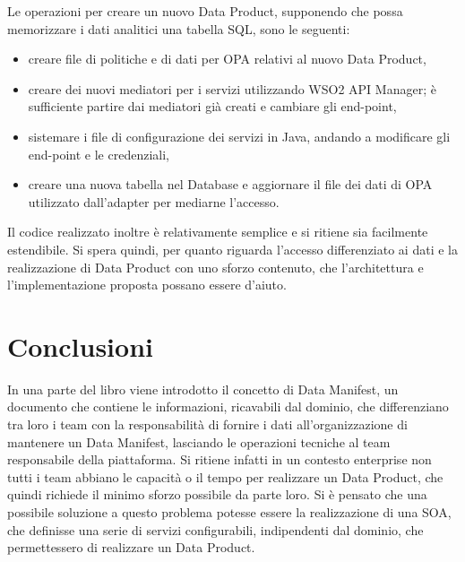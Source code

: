 \documentclass[12pt]{report}
\begin{document}
Le operazioni per creare un nuovo Data Product, supponendo che possa memorizzare i dati analitici una tabella SQL, sono le seguenti: 
\begin{itemize}
    \item creare file di politiche e di dati per OPA relativi al nuovo Data Product,
    \item creare dei nuovi mediatori per i servizi utilizzando WSO2 API Manager; è sufficiente partire dai mediatori già creati e cambiare gli end-point,
    \item sistemare i file di configurazione dei servizi in Java, andando a modificare gli end-point e le credenziali,
    \item creare una nuova tabella nel Database e aggiornare il file dei dati di OPA utilizzato dall'adapter per mediarne l'accesso.
\end{itemize} 
Il codice realizzato inoltre è relativamente semplice e si ritiene sia facilmente estendibile.
Si spera quindi, per quanto riguarda l'accesso differenziato ai dati e la realizzazione di Data Product con uno sforzo contenuto, che l'architettura e l'implementazione proposta possano essere d'aiuto.

\chapter*{Conclusioni}
In una parte del libro \cite{dehghani_data_2022} viene introdotto il concetto di Data Manifest, un documento che contiene le informazioni, ricavabili dal dominio, che differenziano tra loro i team con la responsabilità di fornire i dati all'organizzazione di mantenere un Data Manifest, lasciando le operazioni tecniche al team responsabile della piattaforma.
Si ritiene infatti in un contesto enterprise non tutti i team abbiano le capacità o il tempo per realizzare un Data Product, che quindi richiede il minimo sforzo possibile da parte loro.
Si è pensato che una possibile soluzione a questo problema potesse essere la realizzazione di una SOA, che definisse una serie di servizi configurabili, indipendenti dal dominio, che permettessero di realizzare un Data Product.   
 
 
\end{document}
